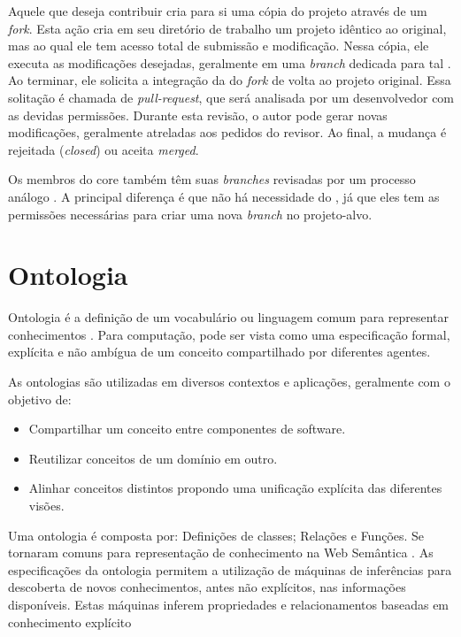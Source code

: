 \documentclass[a4paper,12pt]{monografia}
\theoremstyle{plain}
\theoremstyle{definition}
\theoremstyle{remark}
\begin{document}
  Aquele que deseja contribuir cria para si uma cópia do projeto através de um \textit{fork}. Esta ação cria em seu diretório de trabalho um projeto idêntico ao original, mas ao qual ele tem acesso total de submissão e modificação. Nessa cópia, ele executa as modificações desejadas, geralmente em uma \textit{branch} dedicada para tal \cite{gousios2016}. Ao terminar, ele solicita a integração da  do \textit{fork} de volta ao projeto original. Essa solitação é chamada de \textit{pull-request}, que será analisada por um desenvolvedor com as devidas permissões. Durante esta revisão, o autor pode gerar novas modificações, geralmente atreladas aos pedidos do revisor. Ao final, a mudança é rejeitada (\textit{closed}) ou aceita \textit{merged}.

  Os membros do core também têm suas \textit{branches} revisadas por um processo análogo \cite{6385140,Bosu2014}. A principal diferença é que não há necessidade do , já que eles tem as permissões necessárias para criar uma nova \textit{branch} no projeto-alvo.

\section{Ontologia}

Ontologia é a definição de um vocabulário ou linguagem comum para representar conhecimentos \cite{guarino1998}. Para computação, pode ser vista como uma especificação formal, explícita e não ambígua de um conceito compartilhado por diferentes agentes.

As ontologias são utilizadas em diversos contextos e aplicações, geralmente com o objetivo de:

\begin{itemize}
  \item Compartilhar um conceito entre componentes de software.
  \item Reutilizar conceitos de um domínio em outro.
  \item Alinhar conceitos distintos propondo uma unificação explícita das diferentes visões.
\end{itemize}

Uma ontologia é composta por: Definições de classes; Relações e Funções. Se tornaram comuns para representação de conhecimento na Web Semântica \cite{berners2001}. As especificações da ontologia permitem a utilização de máquinas de inferências para descoberta de novos conhecimentos, antes não explícitos, nas informações disponíveis. Estas máquinas inferem propriedades e relacionamentos baseadas em conhecimento explícito \cite{berners2001}
\end{document}
